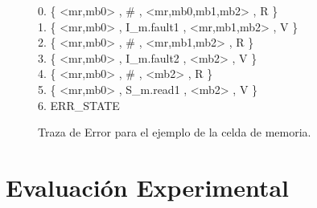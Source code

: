\begin{figure}[t]
\centering
\begin{minipage}[t]{.47\textwidth}
\fontsize{10}{10}\selectfont\ttfamily
\begin{tabbing}
0. \{ <mr,mb0> , \# , <mr,mb0,mb1,mb2> , R \} \\ 
1. \{ <mr,mb0> , I\_m.fault1 , <mr,mb1,mb2> , V \} \\ 
2. \{ <mr,mb0> , \# , <mr,mb1,mb2> , R \} \\ 
3. \{ <mr,mb0> , I\_m.fault2 , <mb2> , V \} \\ 
4. \{ <mr,mb0> , \# , <mb2> , R \} \\ 
5. \{ <mr,mb0> , S\_m.read1 , <mb2> , V \} \\ 
6. ERR\_STATE \\ 
\end{tabbing}
\end{minipage}
\caption{Traza de Error para el ejemplo de la celda de memoria.} \label{fig:trace_mem_cell}
\end{figure}


\section{Evaluación Experimental} \label{sec:experimental_eval}


